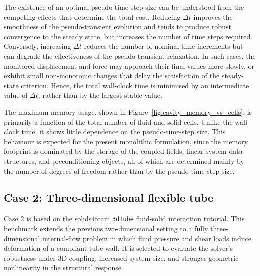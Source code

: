 The existence of an optimal pseudo-time-step size can be understood from the competing effects that determine the total cost. Reducing $\Delta t$ improves the smoothness of the pseudo-transient evolution and tends to produce robust convergence to the steady state, but increases the number of time steps required. Conversely, increasing $\Delta t$ reduces the number of nominal time increments but can degrade the effectiveness of the pseudo-transient relaxation. In such cases, the monitored displacement and force may approach their final values more slowly, or exhibit small non-monotonic changes that delay the satisfaction of the steady-state criterion. Hence, the total wall-clock time is minimised by an intermediate value of $\Delta t$, rather than by the largest stable value.

The maximum memory usage, shown in Figure~\ref{fig:cavity_memory_vs_cells}, is primarily a function of the total number of fluid and solid cells. Unlike the wall-clock time, it shows little dependence on the pseudo-time-step size. This behaviour is expected for the present monolithic formulation, since the memory footprint is dominated by the storage of the coupled fields, linear-system data structures, and preconditioning objects, all of which are determined mainly by the number of degrees of freedom rather than by the pseudo-time-step size.


%
%
%


\subsection{Case 2: Three-dimensional flexible tube} \label{sec:case2}
Case 2 is based on the solids4foam \texttt{3dTube} fluid-solid interaction tutorial. This benchmark extends the previous two-dimensional setting to a fully three-dimensional internal-flow problem in which fluid pressure and shear loads induce deformation of a compliant tube wall. It is selected to evaluate the solver's robustness under 3D coupling, increased system size, and stronger geometric nonlinearity in the structural response.

